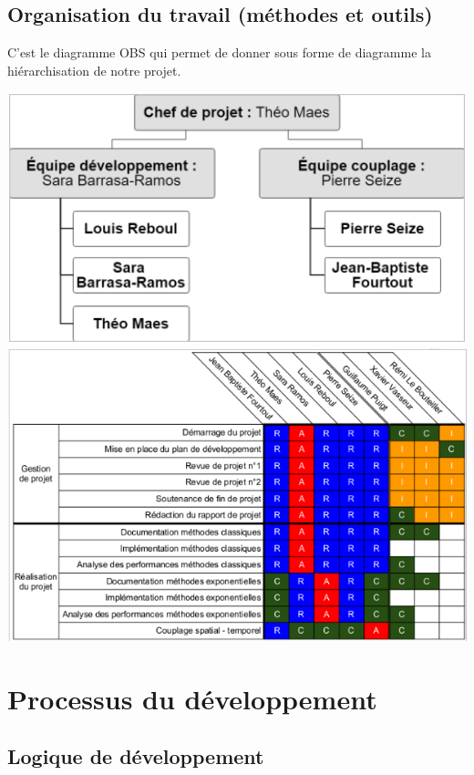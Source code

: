 \documentclass[a4paper,12pt]{report}
\theoremstyle{break}
\begin{document}
\section{Organisation du travail (méthodes et outils)}
    C’est le diagramme OBS qui permet de donner sous forme de diagramme la hiérarchisation de notre projet.
    
    \begin{center}
		
    \includegraphics[width=1\textwidth]{images/OBS.png}\\[1cm]
    
    \includegraphics[width=1\textwidth]{images/OB2.png}\\[1cm]

    \end{center} 
    
\chapter{Processus du développement}
\section{Logique de développement}
\end{document}
